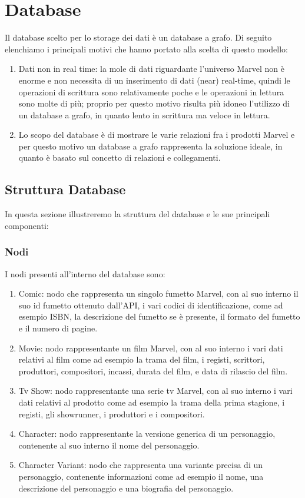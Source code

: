 \documentclass[
12pt, %
a4paper, %
oneside, %
headinclude,footinclude, %
BCOR5mm, %
]{scrartcl}
\begin{document}
\section{Database}
Il database scelto per lo storage dei dati è un database a grafo. Di seguito elenchiamo i principali motivi che hanno portato alla scelta di questo modello:
\begin{enumerate}
	\item Dati non in real time: la mole di dati riguardante l'universo Marvel non è enorme e non necessita di un inserimento di dati (near) real-time, quindi le operazioni di scrittura sono relativamente poche e le operazioni in lettura sono molte di più; proprio per questo motivo risulta più idoneo l'utilizzo di un database a grafo, in quanto lento in scrittura ma veloce in lettura.
	\item Lo scopo del database è di mostrare le varie relazioni fra i prodotti Marvel e per questo motivo un database a grafo rappresenta la soluzione ideale, in quanto è basato sul concetto di relazioni e collegamenti.
\end{enumerate}
\subsection{Struttura Database}
In questa sezione illustreremo la struttura del database e le sue principali componenti:
\subsubsection{Nodi}
I nodi presenti all'interno del database sono:
\begin{enumerate}
	\item Comic: nodo che rappresenta un singolo fumetto Marvel, con al suo interno il suo id fumetto ottenuto dall'API, i vari codici di identificazione, come ad esempio ISBN, la descrizione del fumetto se è presente, il formato del fumetto e il numero di pagine.
	\item Movie: nodo rappresentante un film Marvel, con al suo interno i vari dati relativi al film come ad esempio la trama del film, i registi, scrittori, produttori, compositori, incassi, durata del film, e data di rilascio del film.
	\item Tv Show: nodo rappresentante una serie tv Marvel, con al suo interno i vari dati relativi al prodotto come ad esempio la trama della prima stagione, i registi, gli showrunner, i produttori e i compositori.
	\item Character: nodo rappresentante la versione generica di un personaggio, contenente al suo interno il nome del personaggio.
	\item Character Variant: nodo che rappresenta una variante precisa di un personaggio, contenente informazioni come ad esempio il nome, una descrizione del personaggio e una biografia del personaggio.
\end{enumerate}
\end{document}
